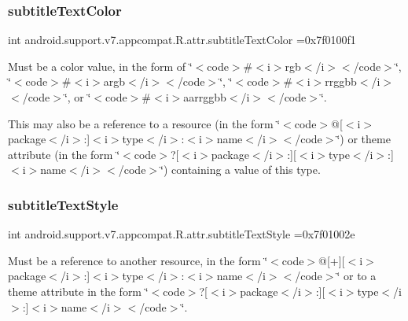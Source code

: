\subsubsection{\texorpdfstring{subtitle\+Text\+Color}{subtitleTextColor}}
{\footnotesize\ttfamily int android.\+support.\+v7.\+appcompat.\+R.\+attr.\+subtitle\+Text\+Color =0x7f0100f1\hspace{0.3cm}{\ttfamily [static]}}

Must be a color value, in the form of \char`\"{}$<$code$>$\#$<$i$>$rgb$<$/i$>$$<$/code$>$\char`\"{}, \char`\"{}$<$code$>$\#$<$i$>$argb$<$/i$>$$<$/code$>$\char`\"{}, \char`\"{}$<$code$>$\#$<$i$>$rrggbb$<$/i$>$$<$/code$>$\char`\"{}, or \char`\"{}$<$code$>$\#$<$i$>$aarrggbb$<$/i$>$$<$/code$>$\char`\"{}. 

This may also be a reference to a resource (in the form \char`\"{}$<$code$>$@\mbox{[}$<$i$>$package$<$/i$>$\+:\mbox{]}$<$i$>$type$<$/i$>$\+:$<$i$>$name$<$/i$>$$<$/code$>$\char`\"{}) or theme attribute (in the form \char`\"{}$<$code$>$?\mbox{[}$<$i$>$package$<$/i$>$\+:\mbox{]}\mbox{[}$<$i$>$type$<$/i$>$\+:\mbox{]}$<$i$>$name$<$/i$>$$<$/code$>$\char`\"{}) containing a value of this type. \mbox{\label{classandroid_1_1support_1_1v7_1_1appcompat_1_1R_1_1attr_a2a9a010f70cdd5dd8a5b63782382f5f7}} 
\subsubsection{\texorpdfstring{subtitle\+Text\+Style}{subtitleTextStyle}}
{\footnotesize\ttfamily int android.\+support.\+v7.\+appcompat.\+R.\+attr.\+subtitle\+Text\+Style =0x7f01002e\hspace{0.3cm}{\ttfamily [static]}}

Must be a reference to another resource, in the form \char`\"{}$<$code$>$@\mbox{[}+\mbox{]}\mbox{[}$<$i$>$package$<$/i$>$\+:\mbox{]}$<$i$>$type$<$/i$>$\+:$<$i$>$name$<$/i$>$$<$/code$>$\char`\"{} or to a theme attribute in the form \char`\"{}$<$code$>$?\mbox{[}$<$i$>$package$<$/i$>$\+:\mbox{]}\mbox{[}$<$i$>$type$<$/i$>$\+:\mbox{]}$<$i$>$name$<$/i$>$$<$/code$>$\char`\"{}. \mbox{\label{classandroid_1_1support_1_1v7_1_1appcompat_1_1R_1_1attr_a0ee770ca62d467ea8536270fe48d2bb2}} 
